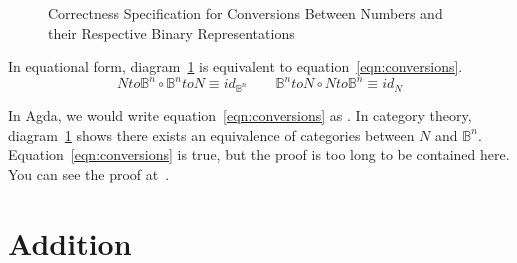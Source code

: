\documentclass[14pt]{extarticle}  %
\begin{document}
\begin{figure}[h]
\centering
\caption{Correctness Specification for Conversions Between Numbers and their Respective Binary Representations}
\label{fig:conversions}
\end{figure}

In equational form, diagram~\ref{fig:conversions} is equivalent to equation~\ref{eqn:conversions}.
\begin{equation}\label{eqn:conversions}
  Nto\mathbb{B}^{n} \circ \mathbb{B}^{n}toN \equiv id_{\mathbb{B}^{n}} \qquad \mathbb{B}^{n}toN \circ Nto\mathbb{B}^{n} \equiv id_{N}
\end{equation}

In Agda, we would write equation~\ref{eqn:conversions} as .
In category theory, diagram~\ref{fig:conversions} shows there exists an equivalence of categories between $N$ and $\mathbb{B}^{n}$.
Equation~\ref{eqn:conversions} is true, but the proof is too long to be contained here. You can see the proof at~\cite{github}.
\section{Addition}
\end{document}
